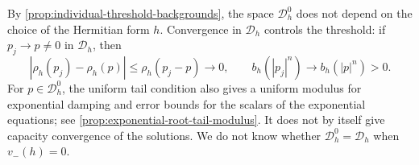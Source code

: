 By \cref{prop:individual-threshold-backgrounds}, the space $\mathcal D_h^0$ does not depend on the choice of the Hermitian form $h$. Convergence in $\mathcal D_h$ controls the threshold: if $p_j\to p\ne0$ in $\mathcal D_h$, then
\[
 |\rho_h(p_j)-\rho_h(p)|\leq\rho_h(p_j-p)\longrightarrow0,
 \qquad b_h(|p_j|^n)\longrightarrow b_h(|p|^n)>0.
\]
For $p\in\mathcal D_h^0$, the uniform tail condition also gives a uniform modulus for exponential damping and error bounds for the scalars of the exponential equations; see \cref{prop:exponential-root-tail-modulus}. It does not by itself give capacity convergence of the solutions. We do not know whether $\mathcal D_h^0=\mathcal D_h$ when $v_-(h)=0$.
